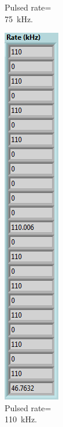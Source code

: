 \begin{figure}[H]
\begin{minipage}{0.24\textwidth}
		\caption{Pulsed rate=\\75~kHz.}
		\label{fig:75khz}
	\end{minipage}
	\begin{minipage}{0.24\textwidth}
		\centering
		\includegraphics[width=.7\linewidth]{IMG/ch5/latch_tests/fig19}
		\caption{Pulsed rate=\\110~kHz.}
		\label{fig:110khz}
	\end{minipage}
\end{figure}

